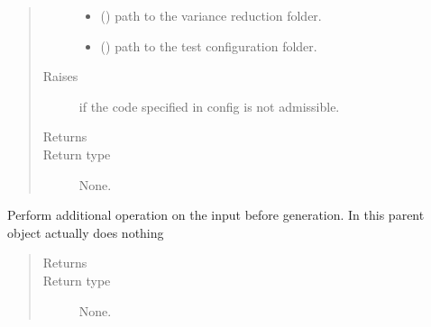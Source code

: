 \documentclass[letterpaper,10pt,english]{sphinxmanual}
\begin{document}
\begin{fulllineitems}
\begin{quote}
\begin{description}
\begin{itemize}
\item {} 
\sphinxAtStartPar
{} () \textendash{} path to the variance reduction folder.

\item {} 
\sphinxAtStartPar
{} () \textendash{} path to the test configuration folder.

\end{itemize}

\item[{Raises}] \leavevmode
\sphinxAtStartPar
{} \textendash{} if the code specified in config is not admissible.

\item[{Returns}] \leavevmode
\sphinxAtStartPar


\item[{Return type}] \leavevmode
\sphinxAtStartPar
None.

\end{description}\end{quote}

\begin{fulllineitems}
\label{\detokenize{api/inputgeneration:testrun.Test.custom_inp_modifications}}
\sphinxAtStartPar
Perform additional operation on the input before generation. In this
parent object actually does nothing
\begin{quote}\begin{description}
\item[{Returns}] \leavevmode
\sphinxAtStartPar


\item[{Return type}] \leavevmode
\sphinxAtStartPar
None.

\end{description}\end{quote}

\end{fulllineitems}



\end{fulllineitems}
\end{document}
